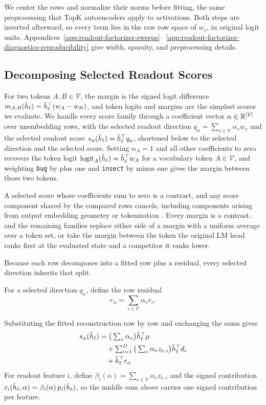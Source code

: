 We center the rows and normalize their norms before fitting, the same
preprocessing that TopK autoencoders apply to activations. Both
steps are inverted afterward, so every term lies in the raw row space
of \(w_v\), in original logit units.
Appendices~\ref{app:readout-factorizer-sweeps}--%
\ref{app:readout-factorizer-diagnostics-reproducibility} give width,
sparsity, and preprocessing details.

\subsection{Decomposing Selected Readout Scores}
\label{sec:method-local-score}

For two tokens \(A,B\in\mathcal{V}\), the margin is the signed logit
difference \(m_{A,B}(\tilde h_\ell)=\tilde h_\ell^\top(w_A-w_B)\), and token
logits and margins are the simplest scores we evaluate. We handle
every score family through a coefficient vector
\(\alpha\in\mathbb{R}^{|\mathcal{V}|}\) over unembedding rows, with the
selected readout direction
\(q_\alpha = \textstyle\sum_{v\in\mathcal{V}} \alpha_v w_v\) and the
selected readout score \(s_\alpha(\tilde h_\ell)=\tilde h_\ell^\top q_\alpha\),
shortened below to the selected direction and the selected score.
Setting \(\alpha_A=1\) and all other coefficients to zero recovers the
token logit \(\operatorname{logit}_A(\tilde h_\ell)=\tilde h_\ell^\top w_A\) for a
vocabulary token \(A\in\mathcal{V}\), and weighting \texttt{bug} by
plus one and \texttt{insect} by minus one gives the margin between
those two tokens.

A selected score whose coefficients sum to zero is a contrast, and
any score component shared by the compared rows cancels, including
components arising from output embedding geometry or tokenization
\citep{press2017outputembedding,inan2017tying,yang2018softmaxbottleneck,bostrom2020bpe}.
Every margin is a contrast, and the remaining families replace either
side of a margin with a uniform average over a token set, or take the
margin between the token the original LM head ranks first at the
evaluated state and a competitor it ranks lower.

Because each row decomposes into a fitted row plus a residual, every
selected direction inherits that split.
\begin{samepage}
For a selected direction \(q_\alpha\), define the row residual
\[
    r_\alpha=\textstyle\sum_{v\in\mathcal{V}}\alpha_v r_v.
\]
\end{samepage}
Substituting the fitted
reconstruction row by row and exchanging the sums gives
\[
\begin{aligned}
    s_\alpha(\tilde h_\ell)
    &=
    \big(\textstyle\sum_v \alpha_v\big) \tilde h_\ell^\top\mu \\
    &\quad + \textstyle\sum_{i=1}^{D}
        \big(\textstyle\sum_v \alpha_v z_{v,i}\big) \tilde h_\ell^\top d_i \\
    &\quad + \tilde h_\ell^\top r_\alpha
\end{aligned}
\]
For readout feature \(i\), define
\(\beta_i(\alpha)=\textstyle\sum_{v\in\mathcal{V}} \alpha_v z_{v,i}\)
and the signed contribution
\(c_i(\tilde h_\ell,\alpha)=\beta_i(\alpha)\,p_i(\tilde h_\ell)\), so the middle
sum above carries one signed contribution per feature.

